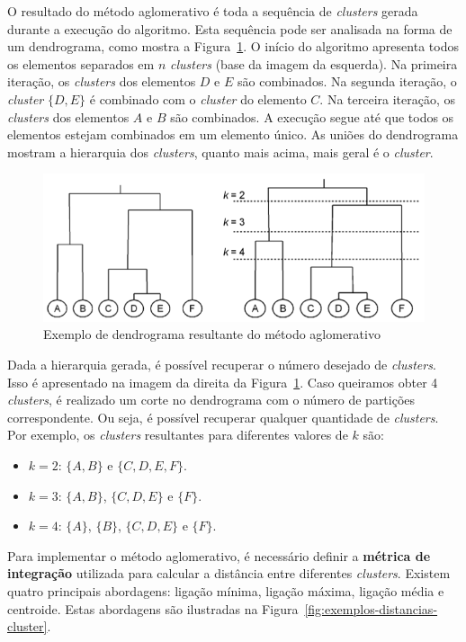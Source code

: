 O resultado do método aglomerativo é toda a sequência de \textit{clusters} gerada durante a execução do algoritmo. Esta sequência pode ser analisada na forma de um dendrograma, como mostra a Figura~\ref{fig:exemplo-dendrograma}. O início do algoritmo apresenta todos os elementos separados em $n$ \textit{clusters} (base da imagem da esquerda). Na primeira iteração, os \textit{clusters} dos elementos $D$ e $E$ são combinados. Na segunda iteração, o \textit{cluster} $\{D, E\}$ é combinado com o \textit{cluster} do elemento $C$. Na terceira iteração, os \textit{clusters} dos elementos $A$ e $B$ são combinados. A execução segue até que todos os elementos estejam combinados em um elemento único. As uniões do dendrograma mostram a hierarquia dos \textit{clusters}, quanto mais acima, mais geral é o \textit{cluster}.

\begin{figure}[h]
	\centering
	\includegraphics[width=\textwidth]{img/exemplo-dendrograma}
	\caption{Exemplo de dendrograma resultante do método aglomerativo}
	\label{fig:exemplo-dendrograma}
\end{figure}

Dada a hierarquia gerada, é possível recuperar o número desejado de \textit{clusters}. Isso é apresentado na imagem da direita da Figura~\ref{fig:exemplo-dendrograma}. Caso queiramos obter 4 \textit{clusters}, é realizado um corte no dendrograma com o número de partições correspondente. Ou seja, é possível recuperar qualquer quantidade de \textit{clusters}. Por exemplo, os \textit{clusters} resultantes para diferentes valores de $k$ são:
\begin{itemize}
	\item $k = 2$: $\{A, B\}$ e $\{C, D, E, F\}$.
	\item $k = 3$: $\{A, B\}$, $\{C, D, E\}$ e $\{F\}$.
	\item $k = 4$: $\{A\}$, $\{B\}$, $\{C, D, E\}$ e $\{F\}$.
\end{itemize}

Para implementar o método aglomerativo, é necessário definir a \textbf{métrica de integração} utilizada para calcular a distância entre diferentes \textit{clusters}. Existem quatro principais abordagens: ligação mínima, ligação máxima, ligação média e centroide. Estas abordagens são ilustradas na Figura~\ref{fig:exemplos-distancias-cluster}.

